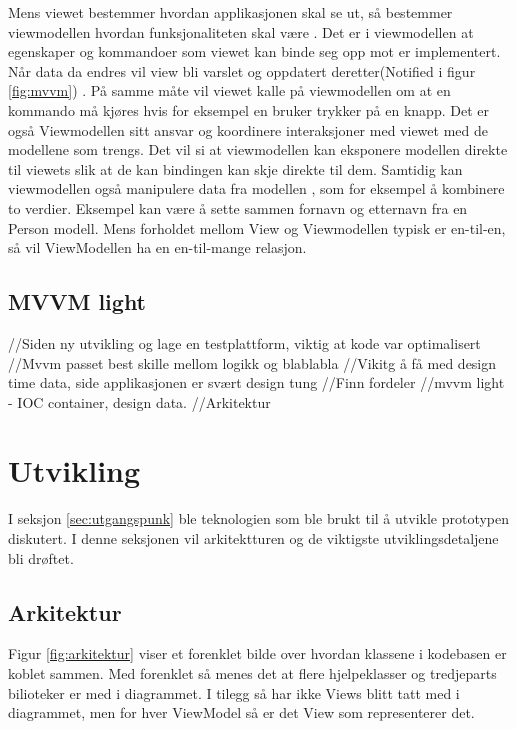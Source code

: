 {Mens viewet bestemmer hvordan applikasjonen skal se ut, så bestemmer viewmodellen hvordan funksjonaliteten skal være \cite{THEM6:online}. Det er i viewmodellen at egenskaper og kommandoer som viewet kan binde seg opp mot er implementert. Når data  da endres vil view bli varslet og oppdatert deretter(Notified i figur \ref{fig:mvvm}) . På samme måte vil viewet kalle på viewmodellen om at en kommando må kjøres hvis for eksempel en bruker trykker på en knapp. Det er også Viewmodellen sitt ansvar og koordinere interaksjoner med viewet med de modellene som trengs. Det vil si at viewmodellen kan eksponere modellen direkte til viewets slik at de kan bindingen kan skje direkte til dem. Samtidig kan viewmodellen også manipulere data fra modellen , som for eksempel å kombinere to verdier. Eksempel kan være å sette sammen fornavn og etternavn fra en Person modell. Mens forholdet mellom View og Viewmodellen typisk er en-til-en, så vil ViewModellen ha en en-til-mange relasjon.  
 
 
\subsection{MVVM light} 
 
 
//Siden ny utvikling og lage en testplattform, viktig at kode var optimalisert 
//Mvvm passet best skille mellom logikk og blablabla 
//Vikitg å få med design time data, side applikasjonen er svært design tung 
//Finn fordeler 
//mvvm light  - IOC container, design data. 
//Arkitektur 
 
 
 
\section{Utvikling}  
 
 
I seksjon \ref{sec:utgangspunk} ble teknologien som ble brukt til å utvikle prototypen diskutert. I denne seksjonen vil arkitektturen og de viktigste utviklingsdetaljene  bli drøftet.  
 
 
\subsection{Arkitektur} 
 
 
Figur \ref{fig:arkitektur} viser et forenklet bilde over hvordan klassene i kodebasen er koblet sammen. Med forenklet så menes det at flere hjelpeklasser og tredjeparts bilioteker er med i diagrammet. I tilegg så har ikke Views blitt tatt med i diagrammet, men for hver ViewModel så er det View som representerer det.  
 

}
